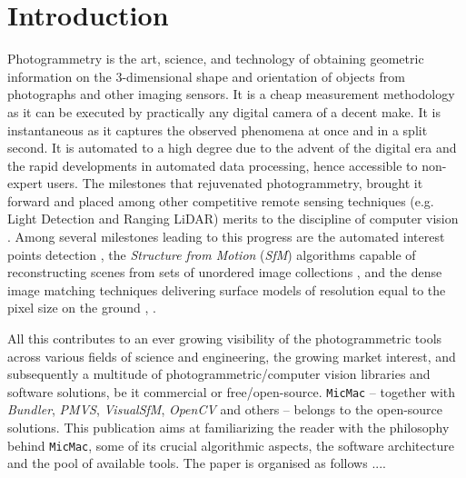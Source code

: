 \documentclass[twocolumn]{bmcart}%
\begin{document}
\section*{Introduction}
Photogrammetry is the art, science, and technology of obtaining geometric information on the 3-dimensional shape and orientation of objects from photographs and other imaging sensors. It is a cheap measurement methodology as it can be executed by practically any digital camera of a decent make. It is instantaneous as it captures the observed phenomena at once and in a split second. It is automated to a high degree due to the advent of the digital era and the rapid developments in automated data processing, hence accessible to non-expert users. The milestones that rejuvenated photogrammetry, brought it forward and placed among other competitive remote sensing techniques (e.g. Light Detection and Ranging LiDAR) merits to the discipline of computer vision \cite{granshaw2015editorial}. Among several milestones leading to this progress are the automated interest points detection \cite{Lowe2004}, the \textit{Structure from Motion} (\textit{SfM}) algorithms capable of reconstructing scenes from sets of unordered image collections \cite{snavely2006photo,marc:11:apero}, and the dense image matching techniques delivering surface models of resolution equal to the pixel size on the ground \cite{pierrot2006multiresolution}, \cite{hirschmuller2008stereo}.\par
%
All this contributes to an ever growing visibility of the photogrammetric tools across various fields of science and engineering, the growing market interest, and subsequently a multitude of photogrammetric/computer vision libraries and software solutions, be it commercial or free/open-source. {\tt MicMac} -- together with \textit{Bundler}, \textit{PMVS}, \textit{VisualSfM}, \textit{OpenCV}  and others -- belongs to the open-source solutions. This publication aims at familiarizing the reader with the philosophy behind {\tt MicMac}, some of its crucial algorithmic aspects, the software architecture and the pool of available tools. The paper is organised as follows ....
 
%  
% 
%
%


 
\end{document}
